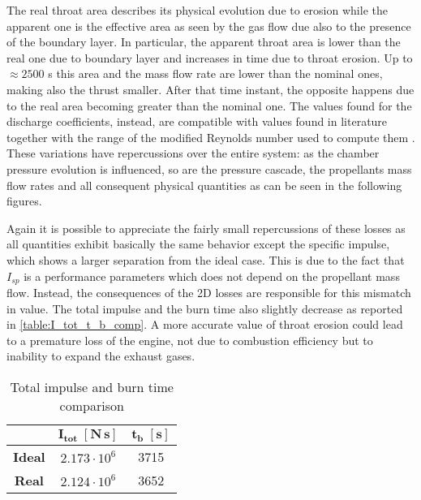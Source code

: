 
The real throat area describes its physical evolution due to erosion while the apparent one is the effective area as seen by the gas flow due also to the presence of the boundary layer.
In particular, the apparent throat area is lower than the real one due to boundary layer and increases in time due to throat erosion. Up to $\approx 2500$ s this area and the mass flow rate are lower than the nominal ones, making also the thrust smaller. After that time instant, the opposite happens due to the real area becoming greater than the nominal one.
The values found for the discharge coefficients, instead, are compatible with values found in literature together with the range of the modified Reynolds number used to compute them \cite{slides_maggi}.
These variations have repercussions over the entire system: as the chamber pressure evolution is influenced, so are the pressure cascade, the propellants mass flow rates and all consequent physical quantities as can be seen in the following figures.


Again it is possible to appreciate the fairly small repercussions of these losses as all quantities exhibit basically the same behavior except the specific impulse, which shows a larger separation from the ideal case.
This is due to the fact that $I_{sp}$ is a performance parameters which does not depend on the propellant mass flow. Instead, the consequences of the 2D losses are responsible for this mismatch in value.
The total impulse and the burn time also slightly decrease as reported in \autoref{table:I_tot_t_b_comp}. A more accurate value of throat erosion could lead to a premature loss of the engine, not due to combustion efficiency but to inability to expand the exhaust gases.

\begin{table}[H]
    \renewcommand{\arraystretch}{1.2}
    \centering
    \begin{tabular}{|c|c|c|}
        \hline
        & $\boldsymbol{I_{tot} \; [\textbf{N} \, \textbf{s}]}$ & $\boldsymbol{t_b \; [\textbf{s}]}$ \\
        \hline
        \hline
        \textbf{Ideal} & $2.173 \cdot 10^6$ & 3715 \\
        \hline
        \textbf{Real} & $2.124 \cdot 10^6$ & 3652 \\
        \hline
    \end{tabular}
    \caption{Total impulse and burn time comparison}
    \label{table:I_tot_t_b_comp}
\end{table}